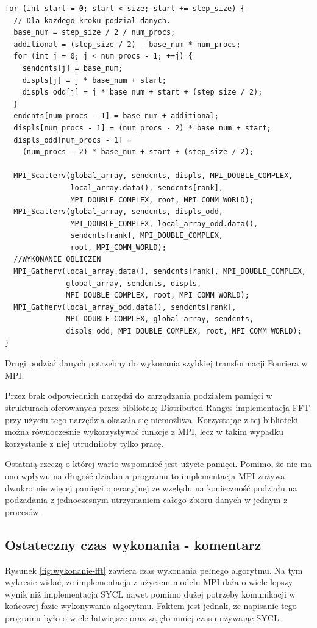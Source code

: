 \documentclass[a4paper,12pt]{book} %
\begin{document}
\begin{lstfloat}
\lstset{language=C++}
\begin{lstlisting}[frame=single]
for (int start = 0; start < size; start += step_size) {
  // Dla kazdego kroku podzial danych.
  base_num = step_size / 2 / num_procs;
  additional = (step_size / 2) - base_num * num_procs;
  for (int j = 0; j < num_procs - 1; ++j) {
    sendcnts[j] = base_num;
    displs[j] = j * base_num + start;
    displs_odd[j] = j * base_num + start + (step_size / 2);
  }
  endcnts[num_procs - 1] = base_num + additional;
  displs[num_procs - 1] = (num_procs - 2) * base_num + start;
  displs_odd[num_procs - 1] =
    (num_procs - 2) * base_num + start + (step_size / 2);

  MPI_Scatterv(global_array, sendcnts, displs, MPI_DOUBLE_COMPLEX,
               local_array.data(), sendcnts[rank], 
               MPI_DOUBLE_COMPLEX, root, MPI_COMM_WORLD);
  MPI_Scatterv(global_array, sendcnts, displs_odd, 
  			   MPI_DOUBLE_COMPLEX, local_array_odd.data(),
  			   sendcnts[rank], MPI_DOUBLE_COMPLEX,
               root, MPI_COMM_WORLD);
  //WYKONANIE OBLICZEN
  MPI_Gatherv(local_array.data(), sendcnts[rank], MPI_DOUBLE_COMPLEX,
              global_array, sendcnts, displs, 
              MPI_DOUBLE_COMPLEX, root, MPI_COMM_WORLD);
  MPI_Gatherv(local_array_odd.data(), sendcnts[rank], 
  			  MPI_DOUBLE_COMPLEX, global_array, sendcnts, 
  			  displs_odd, MPI_DOUBLE_COMPLEX, root, MPI_COMM_WORLD);
}

\end{lstlisting}
\caption{Drugi podział danych potrzebny do wykonania szybkiej transformacji Fouriera w MPI.}
\label{lst:mpi-data-split2}
\end{lstfloat}

Przez brak odpowiednich narzędzi do zarządzania podziałem pamięci w strukturach oferowanych przez bibliotekę Distributed Ranges implementacja FFT przy użyciu tego narzędzia okazała się niemożliwa. Korzystając z tej biblioteki można równocześnie wykorzystywać funkcje z MPI, lecz w takim wypadku korzystanie z niej utrudniłoby tylko pracę.

Ostatnią rzeczą o której warto wspomnieć jest użycie pamięci. Pomimo, że nie ma ono wpływu na długość działania programu to implementacja MPI zużywa dwukrotnie więcej pamięci operacyjnej ze względu na konieczność podziału na podzadania z jednoczesnym utrzymaniem całego zbioru danych w jednym z procesów.

\subsection{Ostateczny czas wykonania - komentarz}
Rysunek \ref{fig:wykonanie-fft} zawiera czas wykonania pełnego algorytmu. Na tym wykresie widać, że implementacja z użyciem modelu MPI dała o wiele lepszy wynik niż implementacja SYCL nawet pomimo dużej potrzeby komunikacji w końcowej fazie wykonywania algorytmu. Faktem jest jednak, że napisanie tego programu było o wiele łatwiejsze oraz zajęło mniej czasu używając SYCL.
\end{document}
